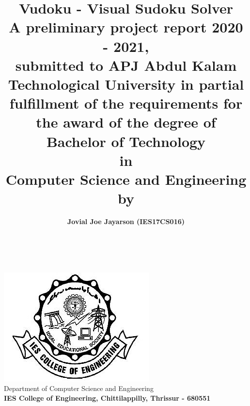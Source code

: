 \documentclass[12pt, a4paper]{report}
\title{\textbf{Vudoku - Visual Sudoku Solver} \\ \vspace{1cm} \large A preliminary project report 2020 - 2021, \\ submitted to APJ Abdul Kalam Technological University in partial fulfillment of the requirements for the award of the degree of \\ \vspace{0.5cm} \large \textbf{Bachelor of Technology \\ in \\ Computer Science and Engineering} \\ \vspace{0.5cm} \large by}
\author{\textbf{Jovial Joe Jayarson (IES17CS016)}}
\date{}
\begin{document}

\makeatletter
\thispagestyle{empty}
\begin{titlepage}
    \begin{center}
        \vspace*{\fill}
        {\huge \@title }\\[0.5cm]
        {\@author} \\[0.5cm]
        \includegraphics[width=0.5\linewidth]{iesce.png}\\[10ex]
        {\large Department of Computer Science and Engineering \\ \textbf{IES College of Engineering, Chittilappilly, Thrissur - 680551}}
        \vspace*{\fill}
    \end{center}
\end{titlepage}

\end{document}
